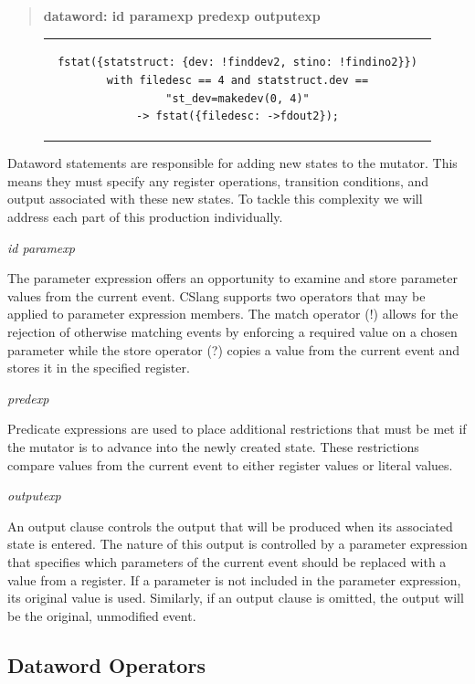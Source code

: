 \begin{quote}
\centering
\textbf{dataword: id paramexp predexp outputexp}
\end{quote}

\begin{figure}[H]
\centering
\begin{tabular}{c}
\begin{lstlisting}
fstat({statstruct: {dev: !finddev2, stino: !findino2}})
with filedesc == 4 and statstruct.dev == "st_dev=makedev(0, 4)"
-> fstat({filedesc: ->fdout2});
\end{lstlisting}
\end{tabular}
\end{figure}

Dataword statements are responsible for adding new states to the
mutator.  This means they must specify any register operations,
transition conditions, and output associated with these new states.  To
tackle this complexity we will address each part of this production
individually.

\textit{id paramexp}

The parameter expression offers an opportunity to examine and store
parameter values from the current event.  CSlang supports two operators
that may be applied to parameter expression members.  The match operator
(!) allows for the rejection of otherwise matching events
by enforcing a required value on a
chosen parameter while the store operator (?) copies a value from the
current event and stores it in the specified register.


\textit{predexp}

Predicate expressions are used to place additional restrictions that must
be met if the mutator is to advance into the newly created state.  These
restrictions compare values from the current event to either register
values or literal values.

\textit{outputexp}

An output clause controls the output that will be produced when its
associated state is entered.  The nature of this output is controlled by a
parameter expression that specifies which parameters of the current event
should be replaced with a value from a register.  If a parameter is not
included in the parameter expression, its original value is used.
Similarly,
if an output clause is omitted, the output will be the
original, unmodified event.

\subsection{Dataword Operators}
\label{sub:DatawordOperators}

